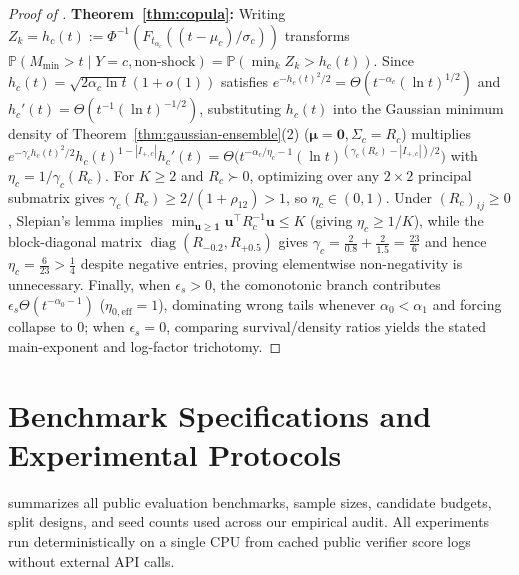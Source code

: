 \documentclass[10pt]{article}
\theoremstyle{plain}
\theoremstyle{definition}
\theoremstyle{remark}
\newcommand{\Prob}{\mathbb{P}}
\begin{document}
\begin{proof}[Proof of ]
\textbf{Theorem~\ref{thm:copula}:} Writing $Z_k = h_c(t) := \Phi^{-1}(F_{t_{\alpha_c}}((t-\mu_c)/\sigma_c))$ transforms $\Prob(M_{\min} > t \mid Y=c, \text{non-shock}) = \Prob(\min_k Z_k > h_c(t))$. Since $h_c(t) = \sqrt{2\alpha_c \ln t}(1+o(1))$ satisfies $e^{-h_c(t)^2/2} = \Theta(t^{-\alpha_c}(\ln t)^{1/2})$ and $h_c'(t) = \Theta(t^{-1}(\ln t)^{-1/2})$, substituting $h_c(t)$ into the Gaussian minimum density of Theorem~\ref{thm:gaussian-ensemble}(2) ($\boldsymbol{\mu}=\mathbf{0}, \Sigma_c = R_c$) multiplies $e^{-\gamma_c h_c(t)^2/2} h_c(t)^{1-|I_{+,c}|} h_c'(t) = \Theta\big(t^{-\alpha_c/\eta_c - 1}(\ln t)^{(\gamma_c(R_c)-|I_{+,c}|)/2}\big)$ with $\eta_c = 1/\gamma_c(R_c)$. For $K \ge 2$ and $R_c \succ 0$, optimizing over any $2\times 2$ principal submatrix gives $\gamma_c(R_c) \ge 2/(1 + \rho_{12}) > 1$, so $\eta_c \in (0, 1)$. Under $(R_c)_{ij} \ge 0$, Slepian's lemma implies $\min_{\mathbf{u}\ge \mathbf{1}} \mathbf{u}^\top R_c^{-1}\mathbf{u} \le K$ (giving $\eta_c \ge 1/K$), while the block-diagonal matrix $\operatorname{diag}(R_{-0.2}, R_{+0.5})$ gives $\gamma_c = \frac{2}{0.8} + \frac{2}{1.5} = \frac{23}{6}$ and hence $\eta_c = \frac{6}{23} > \frac{1}{4}$ despite negative entries, proving elementwise non-negativity is unnecessary. Finally, when $\epsilon_s > 0$, the comonotonic branch contributes $\epsilon_s \Theta(t^{-\alpha_0 - 1})$ ($\eta_{0,\mathrm{eff}} = 1$), dominating wrong tails whenever $\alpha_0 < \alpha_1$ and forcing collapse to $0$; when $\epsilon_s = 0$, comparing survival/density ratios yields the stated main-exponent and log-factor trichotomy.
\end{proof}

\section{Benchmark Specifications and Experimental Protocols}
\label{app:index}

 summarizes all public evaluation benchmarks, sample sizes, candidate budgets, split designs, and seed counts used across our empirical audit. All experiments run deterministically on a single CPU from cached public verifier score logs without external API calls.
\end{document}
